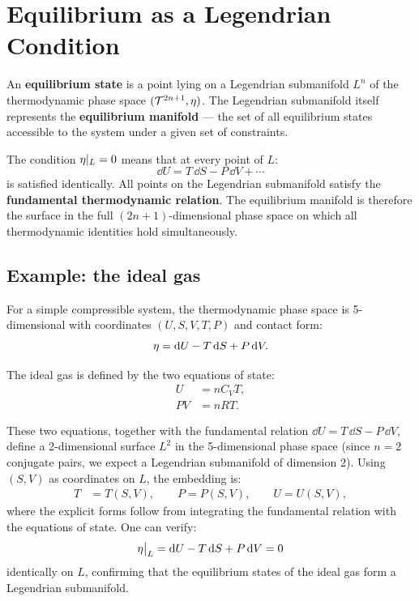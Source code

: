 \section{Equilibrium as a Legendrian Condition}

\begin{definition}
An \textbf{equilibrium state} is a point lying on a Legendrian submanifold $L^n$ of the thermodynamic phase space $(\mathcal{T}^{2n+1}, \eta)$. The Legendrian submanifold itself represents the \textbf{equilibrium manifold} --- the set of all equilibrium states accessible to the system under a given set of constraints.
\end{definition}

The condition $\eta|_L = 0$ means that at every point of $L$:
\begin{equation}
\dd U = T\,\dd S - P\,\dd V + \cdots
\end{equation}
is satisfied identically. All points on the Legendrian submanifold satisfy the \textbf{fundamental thermodynamic relation}. The equilibrium manifold is therefore the surface in the full $(2n+1)$-dimensional phase space on which all thermodynamic identities hold simultaneously.

\subsection{Example: the ideal gas}

For a simple compressible system, the thermodynamic phase space is 5-dimensional with coordinates $(U, S, V, T, P)$ and contact form:
\begin{equation}
\eta = \dd U - T\,\dd S + P\,\dd V.
\end{equation}

The ideal gas is defined by the two equations of state:
\begin{align}
U &= nC_V T, \label{eq:ideal_U}\\
PV &= nRT. \label{eq:ideal_PV}
\end{align}

These two equations, together with the fundamental relation $\dd U = T\,\dd S - P\,\dd V$, define a 2-dimensional surface $L^2$ in the 5-dimensional phase space (since $n = 2$ conjugate pairs, we expect a Legendrian submanifold of dimension 2). Using $(S, V)$ as coordinates on $L$, the embedding is:
\begin{align}
T &= T(S, V), \qquad P = P(S, V), \qquad U = U(S, V),
\end{align}
where the explicit forms follow from integrating the fundamental relation with the equations of state. One can verify:
\begin{equation}
\eta\big|_L = \dd U - T\,\dd S + P\,\dd V = 0
\end{equation}
identically on $L$, confirming that the equilibrium states of the ideal gas form a Legendrian submanifold.

